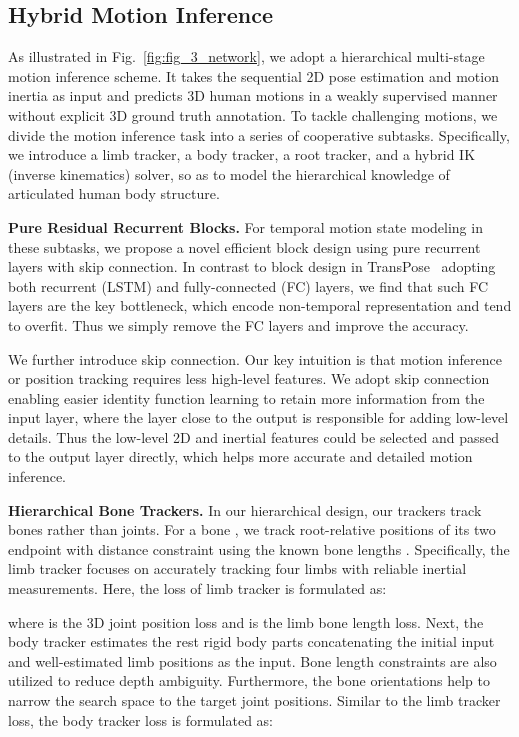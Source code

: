 \documentclass[letterpaper]{article} \usepackage{aaai23}  \usepackage{times}  \usepackage{helvet}  \usepackage{courier}  \usepackage[hyphens]{url}  \usepackage{graphicx} \urlstyle{rm} \def\UrlFont{\rm}  \usepackage{natbib}  \usepackage{caption} \frenchspacing  \setlength{\pdfpagewidth}{8.5in}  \setlength{\pdfpageheight}{11in}  \usepackage{algorithm}
\newcommand{\myparagraph}[1]{\vspace{0.1em}\noindent\textbf{#1}}
\begin{document}
\subsection{Hybrid Motion Inference} \label{sec:mot_inference}
As illustrated in Fig.~\ref{fig:fig_3_network}, we adopt a hierarchical multi-stage motion inference scheme.
It takes the sequential 2D pose estimation and motion inertia as input and predicts 3D human motions in a weakly supervised manner without explicit 3D ground truth annotation.
To tackle challenging motions, we divide the motion inference task into a series of cooperative subtasks.
Specifically, we introduce a limb tracker, a body tracker, a root tracker, and a hybrid IK (inverse kinematics) solver, so as to model the hierarchical knowledge of articulated human body structure.


\myparagraph{Pure Residual Recurrent Blocks.}
For temporal motion state modeling in these subtasks, we propose a novel efficient block design using pure recurrent layers with skip connection.
In contrast to block design in TransPose~\cite{TransPose2021} adopting both recurrent (LSTM) and fully-connected (FC) layers, we find that such FC layers are the key bottleneck, which encode non-temporal representation and tend to overfit. 
Thus we simply remove the FC layers and improve the accuracy.

We further introduce skip connection. Our key intuition is that motion inference or position tracking requires less high-level features. We adopt skip connection enabling easier identity function learning to retain more information from the input layer, where the layer close to the output is responsible for adding low-level details.
Thus the low-level 2D and inertial features could be selected and passed to the output layer directly, which helps more accurate and detailed motion inference.



\myparagraph{Hierarchical Bone Trackers.}
In our hierarchical design, our trackers track bones rather than joints. For a bone , we track root-relative positions of its two endpoint  with distance constraint using the known bone lengths . 
Specifically, the limb tracker focuses on accurately tracking four limbs with reliable inertial measurements. Here, the loss of limb tracker is formulated as:

where  is the 3D joint position loss and  is the limb bone length loss. 
Next, the body tracker estimates the rest rigid body parts concatenating the initial input and well-estimated limb positions as the input. Bone length constraints are also utilized to reduce depth ambiguity. Furthermore, the bone orientations help to narrow the search space to the target joint positions. Similar to the limb tracker loss, the body tracker loss is formulated as:
\end{document}
